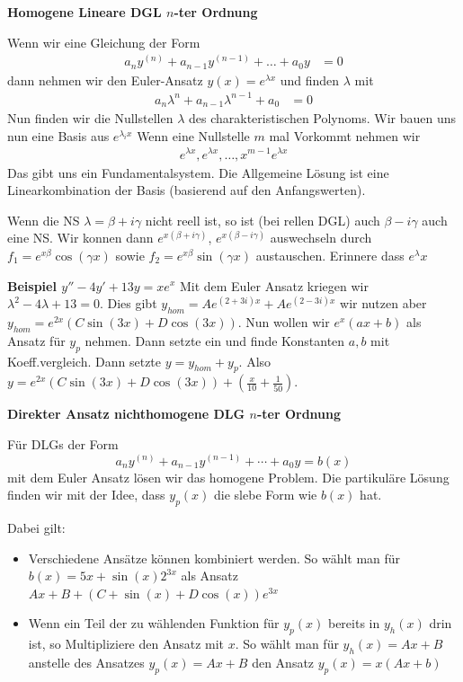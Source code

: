 \documentclass[25pt]{sciposter}
\newenvironment{method}[1]{\begin{mdframed}[backgroundcolor=blue!10,innertopmargin=15pt, innerbottommargin=15pt, nobreak=true]
		\textbf{#1 }
	}
	{ 
	\end{mdframed}
}
\begin{document}
\begin{multicols}{3}
\begin{method}{Homogene Lineare DGL $n$-ter Ordnung}
Wenn wir eine Gleichung der Form
\begin{align*}
a_ny^{(n)} + a_{n-1}y^{(n-1)} + \ldots + a_0 y &= 0
\end{align*}
dann nehmen wir den Euler-Ansatz $y(x) = e^{\lambda x}$ und finden $\lambda$ mit
\begin{align*}
a_n \lambda^n + a_{n-1}\lambda^{n-1} + a_0 &= 0
\end{align*}
Nun finden wir die Nullstellen $\lambda$ des charakteristischen Polynoms. Wir bauen uns nun eine Basis aus $e^{\lambda_i x}$ Wenn eine Nullstelle $m$ mal Vorkommt nehmen wir
\begin{align*}
e^{\lambda x},e^{\lambda x}, \ldots , x^{m-1} e^{\lambda x} 
\end{align*}
Das gibt uns ein Fundamentalsystem. Die Allgemeine Lösung ist eine Linearkombination der Basis (basierend auf den Anfangswerten).
\end{method}

Wenn die NS $\lambda = \beta + i\gamma$ nicht reell ist, so ist (bei rellen DGL) auch $\beta -i\gamma$ auch eine NS. Wir konnen dann $e^{x(\beta + i\gamma)}$, $e^{x(\beta - i\gamma)}$ auswechseln durch $f_1 = e^{x\beta}\cos(\gamma x)$ sowie $f_2 = e^{x\beta}\sin(\gamma x)$ austauschen. Erinnere dass $e^\lambda x$


\textbf{Beispiel $y'' - 4y' + 13y = xe^x$} Mit dem Euler Ansatz kriegen wir $\lambda^2 - 4 \lambda + 13 = 0$. Dies gibt $y_{hom} = Ae^{(2+3i)x} + Ae^{(2-3i)x}$ wir nutzen aber $y_{hom} = e^{2x}(C\sin(3x) + D\cos(3x))$. Nun wollen wir $e^x(ax + b)$ als Ansatz für $y_p$ nehmen. Dann setzte ein und finde Konstanten $a,b$ mit Koeff.vergleich. Dann setzte $y = y_{hom} + y_p$. Also $y = e^{2x}(C\sin(3x) + D\cos(3x)) + \left(\frac{x}{10} + \frac{1}{50}\right)$.



\begin{method}{Direkter Ansatz nichthomogene DLG $n$-ter Ordnung}
	Für DLGs der Form $$a_n y^{(n)} + a_{n-1} y^{(n-1)} + \cdots + a_0 y = b(x)$$
	mit dem Euler Ansatz lösen wir das homogene Problem. Die partikuläre Lösung finden wir mit der Idee, dass $y_p(x)$ die slebe Form wie $b(x)$ hat.
	

\vspace{6cm}
	
	Dabei gilt:
	\begin{itemize}
		\item Verschiedene Ansätze können kombiniert werden. So wählt man für $b(x) = 5x + \sin(x)2^{3x}$ als Ansatz $Ax+B + (C + \sin(x) + D\cos(x))e^{3x}$
		\item Wenn ein Teil der zu wählenden Funktion für $y_p(x)$ bereits in $y_h(x)$ drin ist, so Multipliziere den Ansatz mit $x$. So wählt man für $y_h(x) = Ax + B$ anstelle des Ansatzes $y_p(x) = Ax+B$ den Ansatz $y_p(x) = x(Ax + b)$
	\end{itemize}
\end{method}



\end{multicols}
\end{document}
